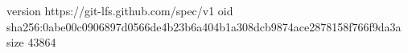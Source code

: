 version https://git-lfs.github.com/spec/v1
oid sha256:0abe00c0906897d0566de4b23b6a404b1a308dcb9874ace2878158f766f9da3a
size 43864
